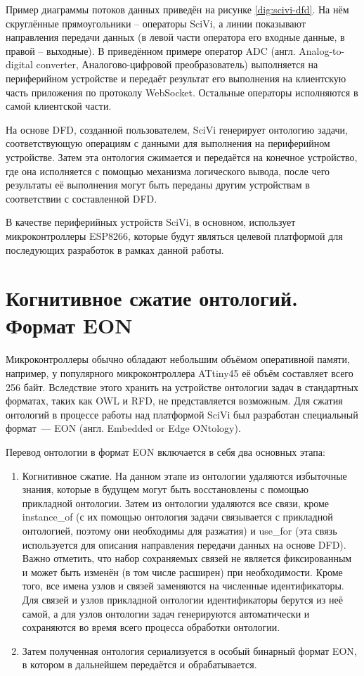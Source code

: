 
Пример диаграммы потоков данных приведён на рисунке \ref{dig:scivi-dfd}.
На нём скруглённые прямоугольники -- операторы SciVi, а линии показывают направления передачи данных (в левой части оператора его входные данные, в правой -- выходные).
В приведённом примере оператор ADC (англ. Analog-to-digital converter, Аналогово-цифровой преобразователь) выполняется на периферийном устройстве и передаёт результат его выполнения на клиентскую часть приложения по протоколу WebSocket.
Остальные операторы исполняются в самой клиентской части.

На основе DFD, созданной пользователем, SciVi генерирует онтологию задачи, соответствующую операциям с данными для выполнения на периферийном устройстве.
Затем эта онтология сжимается и передаётся на конечное устройство, где она исполняется с помощью механизма логического вывода, после чего результаты её выполнения могут быть переданы другим устройствам в соответствии с составленной DFD.

В качестве периферийных устройств SciVi, в основном, использует микроконтроллеры ESP8266, которые будут являться целевой платформой для последующих разработок в рамках данной работы.

\section{Когнитивное сжатие онтологий. Формат EON}

Микроконтроллеры обычно обладают небольшим объёмом оперативной памяти, например, у популярного микроконтроллера ATtiny45 её объём составляет всего 256 байт.
Вследствие этого хранить на устройстве онтологии задач в стандартных форматах, таких как OWL и RFD, не представляется возможным.
Для сжатия онтологий в процессе работы над платформой SciVi был разработан специальный формат~--- EON (англ. Embedded or Edge ONtology).

Перевод онтологии в формат EON включается в себя два основных этапа:
\begin{enumerate}
	\item Когнитивное сжатие.
	На данном этапе из онтологии удаляются избыточные знания, которые в будущем могут быть восстановлены с помощью прикладной онтологии.
	Затем из онтологии удаляются все связи, кроме instance{\_}of (с их помощью онтология задачи связывается с прикладной онтологией, поэтому они необходимы для разжатия) и use{\_}for (эта связь используется для описания направления передачи данных на основе DFD).
	Важно отметить, что набор сохраняемых связей не является фиксированным и может быть изменён (в том числе расширен) при необходимости.
	Кроме того, все имена узлов и связей заменяются на численные идентификаторы.
	Для связей и узлов прикладной онтологии идентификаторы берутся из неё самой, а для узлов онтологии задач генерируются автоматически и сохраняются во время всего процесса обработки онтологии.
	\item Затем полученная онтология сериализуется в особый бинарный формат EON, в котором в дальнейшем передаётся и обрабатывается.
\end{enumerate}

